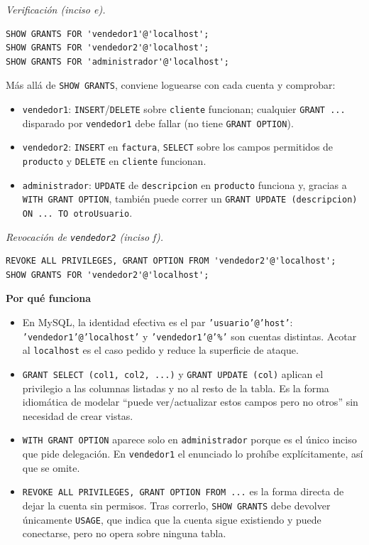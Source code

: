 \documentclass[11pt,a4paper]{article}
\newcommand{\itemcabecera}[1]{\noindent\textbf{#1}\par\medskip}
\newcommand{\bloquePorque}{\itemcabecera{Por qu\'e funciona}}
\begin{document}
\textit{Verificación (inciso e).}

\begin{lstlisting}
SHOW GRANTS FOR 'vendedor1'@'localhost';
SHOW GRANTS FOR 'vendedor2'@'localhost';
SHOW GRANTS FOR 'administrador'@'localhost';
\end{lstlisting}

Más allá de \texttt{SHOW GRANTS}, conviene loguearse con cada cuenta y comprobar:

\begin{itemize}
    \item \texttt{vendedor1}: \texttt{INSERT}/\texttt{DELETE} sobre \texttt{cliente} funcionan; cualquier \texttt{GRANT ...} disparado por \texttt{vendedor1} debe fallar (no tiene \texttt{GRANT OPTION}).
    \item \texttt{vendedor2}: \texttt{INSERT} en \texttt{factura}, \texttt{SELECT} sobre los campos permitidos de \texttt{producto} y \texttt{DELETE} en \texttt{cliente} funcionan.
    \item \texttt{administrador}: \texttt{UPDATE} de \texttt{descripcion} en \texttt{producto} funciona y, gracias a \texttt{WITH GRANT OPTION}, también puede correr un \texttt{GRANT UPDATE (descripcion) ON ... TO otroUsuario}.
\end{itemize}

\textit{Revocación de \texttt{vendedor2} (inciso f).}

\begin{lstlisting}
REVOKE ALL PRIVILEGES, GRANT OPTION FROM 'vendedor2'@'localhost';
SHOW GRANTS FOR 'vendedor2'@'localhost';
\end{lstlisting}

\bloquePorque

\begin{itemize}
    \item En MySQL, la identidad efectiva es el par \texttt{'usuario'@'host'}: \texttt{'vendedor1'@'localhost'} y \texttt{'vendedor1'@'\%'} son cuentas distintas. Acotar al \texttt{localhost} es el caso pedido y reduce la superficie de ataque.
    \item \texttt{GRANT SELECT (col1, col2, ...)} y \texttt{GRANT UPDATE (col)} aplican el privilegio a las columnas listadas y no al resto de la tabla. Es la forma idiomática de modelar ``puede ver/actualizar estos campos pero no otros'' sin necesidad de crear vistas.
    \item \texttt{WITH GRANT OPTION} aparece solo en \texttt{administrador} porque es el único inciso que pide delegación. En \texttt{vendedor1} el enunciado lo prohíbe explícitamente, así que se omite.
    \item \texttt{REVOKE ALL PRIVILEGES, GRANT OPTION FROM ...} es la forma directa de dejar la cuenta sin permisos. Tras correrlo, \texttt{SHOW GRANTS} debe devolver únicamente \texttt{USAGE}, que indica que la cuenta sigue existiendo y puede conectarse, pero no opera sobre ninguna tabla.
\end{itemize}
\end{document}
